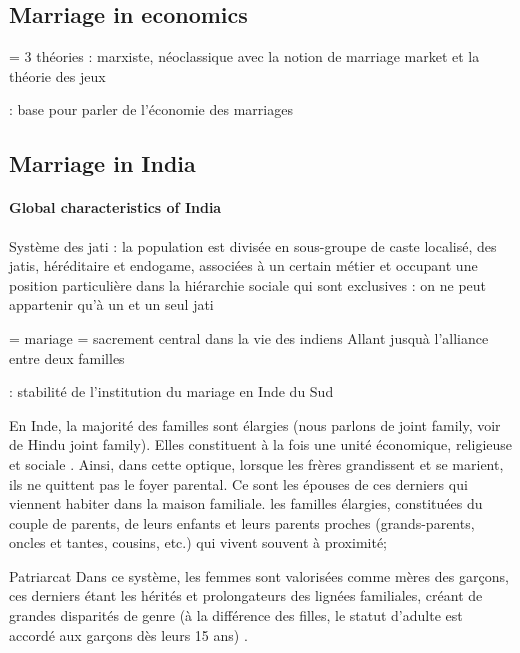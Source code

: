 \documentclass[a4paper, 11pt, onecolumn]{article}
\begin{document}
\citep{Gupta1972}

\citep{Anukriti2018a}



	\subsection{Marriage in economics}

\cite{Grossbard1999a, Grossbard1999b} = 3 théories : marxiste, néoclassique avec la notion de marriage market et la théorie des jeux


\cite{Becker1973} : base pour parler de l'économie des marriages


	\subsection{Marriage in India}

\paragraph{Global characteristics of India}
Système des jati : la population est divisée en sous-groupe de caste localisé, des jatis, héréditaire et endogame, associées à un certain métier et occupant une position particulière dans la hiérarchie sociale qui sont exclusives : on ne peut appartenir qu’à un et un seul jati

\cite{Radhakrishnan1937} = mariage = sacrement central dans la vie des indiens
Allant jusquà l'alliance entre deux familles \citep{Sheela2003}

\cite{James2015} : stabilité de l'institution du mariage en Inde du Sud

En Inde, la majorité des familles sont élargies (nous parlons de joint family, voir de Hindu joint
family). Elles constituent à la fois une unité économique, religieuse et sociale \citep{Chandrasekhar1943}. Ainsi, dans cette optique, lorsque les frères grandissent et se marient, ils ne quittent
pas le foyer parental. Ce sont les épouses de ces derniers qui viennent habiter dans la maison
familiale.
les familles élargies, constituées du couple de parents, de leurs enfants et leurs parents
proches (grands-parents, oncles et tantes, cousins, etc.) qui vivent souvent à proximité;

Patriarcat
Dans ce système, les femmes sont valorisées
comme mères des garçons, ces derniers étant les hérités et prolongateurs des lignées familiales,
créant de grandes disparités de genre (à la différence des filles, le statut d’adulte est accordé
aux garçons dès leurs 15 ans) \citep{Marius2017}.
\end{document}
